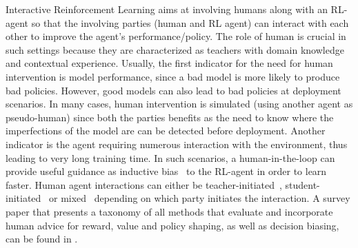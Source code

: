 Interactive Reinforcement Learning aims at involving humans along with an RL-agent so that the involving parties (human and RL agent) can interact with each other to improve the agent's performance/policy. The role of human is crucial in such settings because they are characterized as teachers with domain knowledge and contextual experience. 
Usually, the first indicator for the need for human intervention is model performance, since a bad model is more likely to produce bad policies. However, good models can also lead to bad policies at deployment scenarios. In many cases, human intervention is simulated (using another agent as pseudo-human) since both the parties benefits as the need to know where the imperfections of the model are can be detected before deployment. Another indicator is the agent requiring numerous interaction with the environment, thus leading to very long training time. In such scenarios, a human-in-the-loop can provide useful guidance as inductive bias~\cite{} to the RL-agent in order to learn faster. Human agent interactions can either be teacher-initiated~\cite{}, student-initiated~\cite{} or mixed~\cite{} depending on which party initiates the interaction. A survey paper that presents a taxonomy of all methods that evaluate and incorporate human advice for reward, value and policy shaping, as well as decision biasing, can be found in  \cite{Najar:2021:RLWithHumanAdvice, Arzate:2020:SurveyInteractiveRL}.




